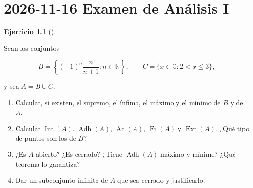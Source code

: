 \documentclass[
  spanish,
  a4paper,
]{scrreport}
\theoremstyle{definition}
\newtheorem{exercise}{Ejercicio}[chapter]
\theoremstyle{remark}
\begin{document}

\chapter{\texorpdfstring{2026-11-16 Examen de Análisis
I}{2026-11-16  Examen de Análisis I}}\label{examen-de-anuxe1lisis-i-8}

\begin{exercise}[]\protect\hypertarget{exr-1}{}\label{exr-1}

Sean los conjuntos

\[
B = \left\{(-1)^n\frac{n}{n+1} : n\in\mathbb{N}\right\}, \qquad C = \{x\in\mathbb{Q} : 2 < x \leq 3\},
\]

y sea \(A = B\cup C\).

\begin{enumerate}
\def\labelenumi{\alph{enumi}.}
\item
  Calcular, si existen, el supremo, el ínfimo, el máximo y el mínimo de
  \(B\) y de \(A\).
\item
  Calcular \(\operatorname{Int}(A)\), \(\operatorname{Adh}(A)\),
  \(\operatorname{Ac}(A)\), \(\operatorname{Fr}(A)\) y
  \(\operatorname{Ext}(A)\). ¿Qué tipo de puntos son los de \(B\)?
\item
  ¿Es \(A\) abierto? ¿Es cerrado? ¿Tiene \(\operatorname{Adh}(A)\)
  máximo y mínimo? ¿Qué teorema lo garantiza?
\item
  Dar un subconjunto infinito de \(A\) que sea cerrado y justificarlo.
\end{enumerate}

\end{exercise}
\end{document}
